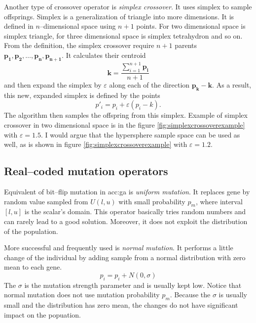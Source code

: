 Another type of crossover operator is \emph{simplex crossover}. It uses simplex to sample offsprings. Simplex is a generalization of triangle into more dimensions. It is defined in $n$--dimensional space using $n+1$ points. For two dimensional space is simplex triangle, for three dimensional space is simplex tetrahydron and so on. From the definition, the simplex crossover require $n+1$ parents $\mathbf{p_1}, \mathbf{p_2}, \dots, \mathbf{p_n}, \mathbf{p_{n+1}}$. It calculates their centroid
$$
\mathbf{k}=\frac{\sum_{i=1}^{n+1} \mathbf{p_i}}{n+1}
$$
and then expand the simplex by $\varepsilon$ along each of the direction $\mathbf{p_k} - \mathbf{k}$. As a result, this new, expanded simplex is defined by the points
\boldmath
$$
p'_i = p_i + \varepsilon\left( p_i - k \right).
$$
\unboldmath
The algorithm then samples the offspring from this simplex. Example of simplex crossover in two dimensional space is in the figure \ref{fig:simplexcrossoverexample} with $\varepsilon=1.5$.
I would argue that the hypersphere sample space can be used as well, as is shown in figure \ref{fig:simplexcrossoverexample} with $\varepsilon=1.2$.

\subsection{Real--coded mutation operators}

Equivalent of bit--flip mutation in \acrshort{acc:ga} is \emph{uniform mutation}. It replaces gene by random value sampled from $U(l,u)$ with small probability $p_m$, where interval $\left[l,u\right]$ is the scalar's domain. This operator basically tries random numbers and can rarely lead to a good solution. Moreover, it does not exploit the distribution of the population.

More successful and frequently used is \emph{normal mutation}. It performs a little change of the individual by adding sample from a normal distribution with zero mean to each gene.
$$
p_i = p_i + N(0,\sigma)
$$
The $\sigma$ is the mutation strength parameter and is usually kept low. Notice that normal mutation does not use mutation probability $p_m$. Because the $\sigma$ is usually small and the distribution has zero mean, the changes do not have significant impact on the popuation.

